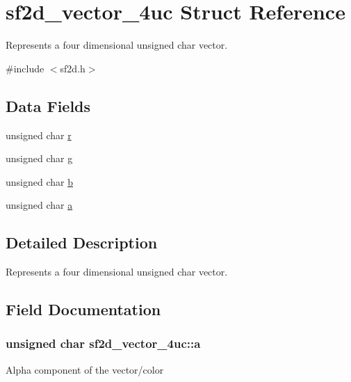 \hypertarget{structsf2d__vector__4uc}{}\section{sf2d\+\_\+vector\+\_\+4uc Struct Reference}
\label{structsf2d__vector__4uc}


Represents a four dimensional unsigned char vector.  




{\ttfamily \#include $<$sf2d.\+h$>$}

\subsection*{Data Fields}
\begin{DoxyCompactItemize}
\item 
unsigned char \hyperlink{structsf2d__vector__4uc_a7a05fef1e4716854c60679ebc78d6c16}{r}
\item 
unsigned char \hyperlink{structsf2d__vector__4uc_a0aa65c7dcc7f056612d98c185a042e91}{g}
\item 
unsigned char \hyperlink{structsf2d__vector__4uc_a4d2cb3735537b2f162955a9ec88931cd}{b}
\item 
unsigned char \hyperlink{structsf2d__vector__4uc_a9575605360e1317255a108f90cac1b62}{a}
\end{DoxyCompactItemize}


\subsection{Detailed Description}
Represents a four dimensional unsigned char vector. 

\subsection{Field Documentation}
\hypertarget{structsf2d__vector__4uc_a9575605360e1317255a108f90cac1b62}{}
\subsubsection[{a}]{\setlength{\rightskip}{0pt plus 5cm}unsigned char sf2d\+\_\+vector\+\_\+4uc\+::a}\label{structsf2d__vector__4uc_a9575605360e1317255a108f90cac1b62}
Alpha component of the vector/color \hypertarget{structsf2d__vector__4uc_a4d2cb3735537b2f162955a9ec88931cd}{}
